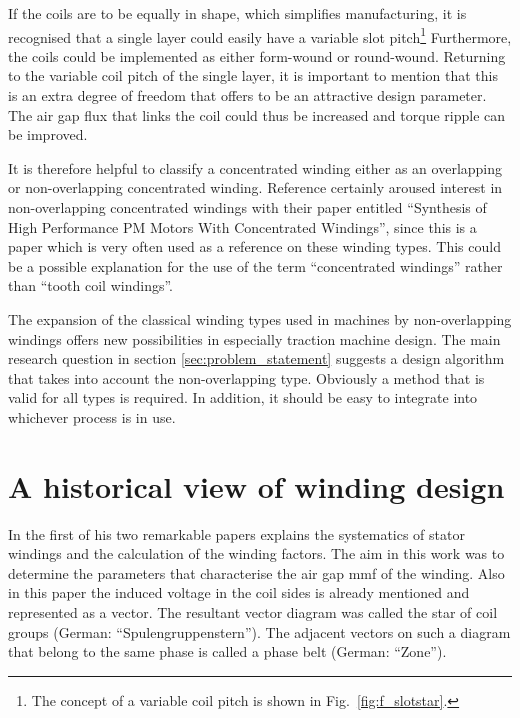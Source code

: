 If the coils are to be equally in shape, which simplifies manufacturing, it is recognised that a single layer could easily have a variable slot pitch\footnote{The concept of a variable coil pitch is shown in Fig.~\ref{fig:f_slotstar}.} Furthermore, the coils could be implemented as either form-wound or round-wound. Returning to the variable coil pitch of the single layer, it is important to mention that this is an extra degree of freedom that offers to be an attractive design parameter. The air gap flux that links the coil could thus be increased and torque ripple can be improved. 

It is therefore helpful to classify a concentrated winding either as an overlapping or non-overlapping concentrated winding. Reference \cite{REF-00754} certainly aroused interest in non-overlapping concentrated windings with their paper entitled ``Synthesis of High Performance PM Motors With Concentrated Windings'', since this is a paper which is very often used as a reference on these winding types. This could be a possible explanation for the use of the term ``concentrated windings'' rather than ``tooth coil windings''.

The expansion of the classical winding types used in machines by non-overlapping windings offers new possibilities in especially traction machine design. The main research question in section \ref{sec:problem_statement} suggests a design algorithm that takes into account the non-overlapping type. Obviously a method that is valid for all types is required. In addition, it should be easy to integrate into whichever process is in use. 

\section{A historical view of winding design}
In the first of his two remarkable papers \cite{REF-00835, REF-00836} explains the systematics of stator windings and the calculation of the winding factors. The aim in this work was to determine the parameters that characterise the air gap mmf of the winding. Also in this paper the induced voltage in the coil sides is already mentioned and represented as a vector. The resultant vector diagram was called the star of coil groups (German: ``Spulengruppenstern''). The adjacent vectors on such a diagram that belong to the same phase is called a phase belt (German: ``Zone'').

